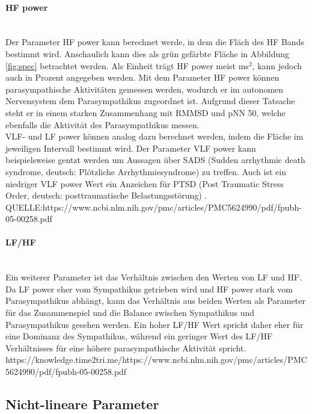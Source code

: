  \paragraph{HF power}\mbox{} \\
 Der Parameter HF power kann berechnet werde, in dem die Fläch des HF Bands bestimmt wird. Anschaulich kann dies als grün gefärbte Fläche in Abbildung \ref{fig:spec} betrachtet werden. Als Einheit trägt HF power meist ms$^{2}$, kann jedoch auch in Prozent angegeben werden. 
 Mit dem Parameter HF power können parasympathische Aktivitäten gemessen werden, wodurch er im autonomen Nervensystem dem Parasympathikus zugeordnet ist. Aufgrund dieser Tatsache steht er in einem starken Zusammenhang mit RMMSD und pNN 50, welche ebenfalls die Aktivität des Parasympathikus messen. \\
 VLF- und LF power können analog dazu berechnet werden, indem die Fläche im jeweiligen Intervall bestimmt wird. Der Parameter VLF power kann beispielsweise gentzt werden um Aussagen über SADS (Sudden arrhythmic death syndrome, deutsch: Plötzliche Arrhythmiesyndrome) zu treffen. Auch ist ein niedriger VLF power Wert ein Anzeichen für PTSD (Post Traumatic Stress Order, deutsch: posttraumatische Belastungsstörung) . QUELLE:https://www.ncbi.nlm.nih.gov/pmc/articles/PMC5624990/pdf/fpubh-05-00258.pdf
 
 \paragraph{LF/HF}\mbox{} \\
 Ein weiterer Parameter ist das Verhältnis zwischen den Werten von LF und HF. Da LF power eher vom Sympathikus getrieben wird und HF power stark vom Parasympathikus abhängt, kann das Verhältnis aus beiden Werten als Parameter für das Zusammenspiel und die Balance zwischen Sympathikus und Parasympathikus gesehen werden. Ein hoher LF/HF Wert spricht daher eher für eine Dominanz des Sympathikus, während ein geringer Wert des LF/HF Verhältnisses für eine höhere parasympathische Aktivität spricht. https://knowledge.time2tri.me/https://www.ncbi.nlm.nih.gov/pmc/articles/PMC5624990/pdf/fpubh-05-00258.pdf
 
 \subsection{Nicht-lineare Parameter}
 
